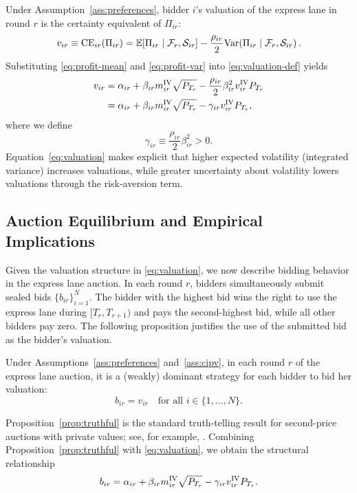 Under Assumption~\ref{ass:preferences}, bidder $i$'s valuation of the express lane in round $r$ is the certainty equivalent of $\Pi_{ir}$:
\begin{equation}\label{eq:valuation-def}
  v_{ir}
  \equiv \mathrm{CE}_{ir}(\Pi_{ir})
  = \mathbb{E}\!\left[\Pi_{ir} \mid \mathcal F_r, \mathcal S_{ir} \right]
    - \frac{\rho_{ir}}{2}
      \mathrm{Var}\!\left(\Pi_{ir} \mid \mathcal F_r, \mathcal S_{ir} \right).
\end{equation}
Substituting \eqref{eq:profit-mean} and \eqref{eq:profit-var} into
\eqref{eq:valuation-def} yields
\begin{align}
  v_{ir}
    &= \alpha_{ir}
       + \beta_{ir} m^{\mathrm{IV}}_{ir} \sqrt{P_{T_r}}
       - \frac{\rho_{ir}}{2} \beta_{ir}^2 v^{\mathrm{IV}}_{ir} P_{T_r} \nonumber \\
    &= \alpha_{ir}
       + \beta_{ir} m^{\mathrm{IV}}_{ir} \sqrt{P_{T_r}}
       - \gamma_{ir} v^{\mathrm{IV}}_{ir} P_{T_r},
       \label{eq:valuation}
\end{align}
where we define
\[
  \gamma_{ir} \equiv \frac{\rho_{ir}}{2} \beta_{ir}^2 > 0.
\]
Equation~\eqref{eq:valuation} makes explicit that higher expected volatility (integrated variance) increases valuations, while greater uncertainty about volatility lowers valuations through the risk-aversion term.

\subsection{Auction Equilibrium and Empirical Implications}

Given the valuation structure in \eqref{eq:valuation}, we now describe bidding behavior in the express lane auction. In each round $r$, bidders simultaneously submit sealed bids $\{b_{ir}\}_{i=1}^N$. The bidder with the highest bid wins the right to use the express lane during $[T_r, T_{r+1})$ and pays the second-highest bid, while all other bidders pay zero. The following proposition justifies the use of the submitted bid as the bidder's valuation.

\begin{prop}\label{prop:truthful}
Under Assumptions~\ref{ass:preferences} and~\ref{ass:cipv}, in each round $r$ of the express lane auction, it is a (weakly) dominant strategy for each bidder to bid her valuation:
\[
  b_{ir} = v_{ir} \quad \text{for all } i \in \{1,\dots,N\}.
\]
\end{prop}

Proposition~\ref{prop:truthful} is the standard truth-telling result for second-price auctions with private values; see, for example, \cite{krishna2009auction}. Combining Proposition~\ref{prop:truthful} with \eqref{eq:valuation}, we obtain the structural relationship
\begin{equation}\label{eq:structural-bid}
  b_{ir}
  = \alpha_{ir}
    + \beta_{ir} m^{\mathrm{IV}}_{ir} \sqrt{P_{T_r}}
    - \gamma_{ir} v^{\mathrm{IV}}_{ir} P_{T_r}.
\end{equation}

